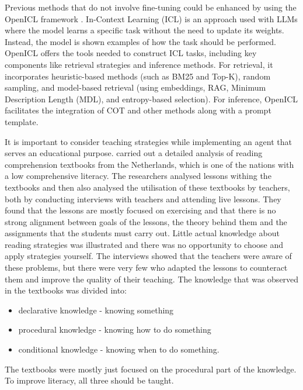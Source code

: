 \documentclass[fleqn,moreauthors,10pt]{ds_report}
\begin{document}
Previous methods that do not involve fine-tuning could be enhanced by using the OpenICL framework \cite{wu2023openicl}. In-Context Learning (ICL) is an approach used with LLMs where the model learns a specific task without the need to update its weights. Instead, the model is shown examples of how the task should be performed. OpenICL offers the tools needed to construct ICL tasks, including key components like retrieval strategies and inference methods. For retrieval, it incorporates heuristic-based methods (such as BM25 and Top-K), random sampling, and model-based retrieval (using embeddings, RAG, Minimum Description Length (MDL), and entropy-based selection). For inference, OpenICL facilitates the integration of COT and other methods along with a prompt template.

It is important to consider teaching strategies while implementing an agent that serves an educational purpose.
\cite{bogaerds2022textbooks} carried out a detailed analysis of reading comprehension textbooks from the Netherlands, which is one of the nations with a low comprehensive literacy.
The researchers analysed lessons withing the textbooks and then also analysed the utilisation of these textbooks by teachers, both by conducting interviews with teachers and attending live lessons.
They found that the lessons are mostly focused on exercising and that there is no strong alignment between goals of the lessons, the theory behind them and the assignments that the students must carry out.
Little actual knowledge about reading strategies was illustrated and there was no opportunity to choose and apply strategies yourself.
The interviews showed that the teachers were aware of these problems, but there were very few who adapted the lessons to counteract them and improve the quality of their teaching.
The knowledge that was observed in the textbooks was divided into:
\begin{itemize}
	\itemsep0em
	\item declarative knowledge - knowing something
	\item procedural knowledge - knowing how to do something
	\item conditional knowledge - knowing when to do something.
\end{itemize}
The textbooks were mostly just focused on the procedural part of the knowledge.
To improve literacy, all three should be taught.
\end{document}
